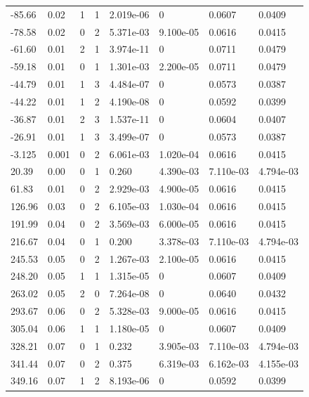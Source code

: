 \documentclass[preview]{standalone}
\begin{document}
{{\begin{tabular}{L{1.2cm}C{1.2cm} C{0.3cm}C{0.5cm} C{1.4cm}C{1.4cm} C{1.4cm}C{1.4cm}}
  -85.66  &  0.02  & 1     &  1 &  2.019e-06  & 0  & 0.0607 &  0.0409   \\ 
  -78.58  &  0.02  & 0     &  2 &  5.371e-03  & 9.100e-05  & 0.0616 &  0.0415   \\ 
  -61.60  &  0.01  & 2     &  1 &  3.974e-11  & 0  & 0.0711 &  0.0479   \\ 
  -59.18  &  0.01  & 0     &  1 &  1.301e-03  & 2.200e-05  & 0.0711 &  0.0479   \\ 
  -44.79  &  0.01  & 1     &  3 &  4.484e-07  & 0  & 0.0573 &  0.0387   \\ 
  -44.22  &  0.01  & 1     &  2 &  4.190e-08  & 0  & 0.0592 &  0.0399   \\ 
  -36.87  &  0.01  & 2     &  3 &  1.537e-11  & 0  & 0.0604 &  0.0407   \\ 
  -26.91  &  0.01  & 1     &  3 &  3.499e-07  & 0  & 0.0573 &  0.0387   \\ 
  -3.125  &  0.001  & 0     &  2 &  6.061e-03  & 1.020e-04  & 0.0616 &  0.0415   \\ 
  20.39  &  0.00  & 0     &  1 &  0.260  & 4.390e-03  & 7.110e-03 &  4.794e-03   \\ 
  61.83  &  0.01  & 0     &  2 &  2.929e-03  & 4.900e-05  & 0.0616 &  0.0415   \\ 
  126.96  &  0.03  & 0     &  2 &  6.105e-03  & 1.030e-04  & 0.0616 &  0.0415   \\ 
  191.99  &  0.04  & 0     &  2 &  3.569e-03  & 6.000e-05  & 0.0616 &  0.0415   \\ 
  216.67  &  0.04  & 0     &  1 &  0.200  & 3.378e-03  & 7.110e-03 &  4.794e-03   \\ 
  245.53  &  0.05  & 0     &  2 &  1.267e-03  & 2.100e-05  & 0.0616 &  0.0415   \\ 
  248.20  &  0.05  & 1     &  1 &  1.315e-05  & 0  & 0.0607 &  0.0409   \\ 
  263.02  &  0.05  & 2     &  0 &  7.264e-08  & 0  & 0.0640 &  0.0432   \\ 
  293.67  &  0.06  & 0     &  2 &  5.328e-03  & 9.000e-05  & 0.0616 &  0.0415   \\ 
  305.04  &  0.06  & 1     &  1 &  1.180e-05  & 0  & 0.0607 &  0.0409   \\ 
  328.21  &  0.07  & 0     &  1 &  0.232  & 3.905e-03  & 7.110e-03 &  4.794e-03   \\ 
  341.44  &  0.07  & 0     &  2 &  0.375  & 6.319e-03  & 6.162e-03 &  4.155e-03   \\ 
  349.16  &  0.07  & 1     &  2 &  8.193e-06  & 0  & 0.0592 &  0.0399   \\ 

\end{tabular}}}
\end{document}
